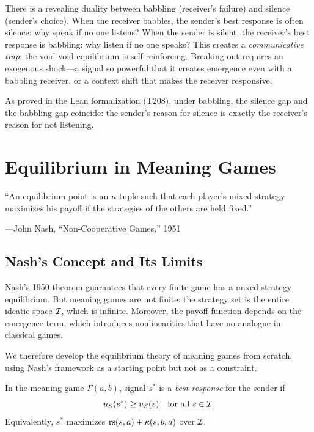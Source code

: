 \begin{remark}
There is a revealing duality between babbling (receiver's failure) and
silence (sender's choice). When the receiver babbles, the sender's best
response is often silence: why speak if no one listens? When the sender
is silent, the receiver's best response is babbling: why listen if no one
speaks? This creates a \emph{communicative trap}: the void-void equilibrium
is self-reinforcing. Breaking out requires an exogenous shock---a signal
so powerful that it creates emergence even with a babbling receiver, or
a context shift that makes the receiver responsive.

As proved in the Lean formalization (T208), under babbling, the silence
gap and the babbling gap coincide: the sender's reason for silence is
exactly the receiver's reason for not listening.
\end{remark}



\chapter{Equilibrium in Meaning Games}
\label{ch:equilibrium}

\epigraph{``An equilibrium point is an $n$-tuple such that each player's
mixed strategy maximizes his payoff if the strategies of the others are
held fixed.''}
{---John Nash, ``Non-Cooperative Games,'' 1951}


\section{Nash's Concept and Its Limits}

Nash's 1950 theorem guarantees that every finite game has a mixed-strategy
equilibrium. But meaning games are not finite: the strategy set is the entire
ideatic space $\mathcal{I}$, which is infinite. Moreover, the payoff function depends
on the emergence term, which introduces nonlinearities that have no analogue
in classical games.

We therefore develop the equilibrium theory of meaning games from scratch,
using Nash's framework as a starting point but not as a constraint.

\begin{definition}
\label{def:best-response}
In the meaning game $\Gamma(a, b)$, signal $s^*$ is a \emph{best response}
for the sender if
\[
u_S(s^*) \geq u_S(s) \quad \text{for all } s \in \mathcal{I}.
\]
Equivalently, $s^*$ maximizes $\mathrm{rs}(s, a) + \kappa(s, b, a)$ over $\mathcal{I}$.
\end{definition}

